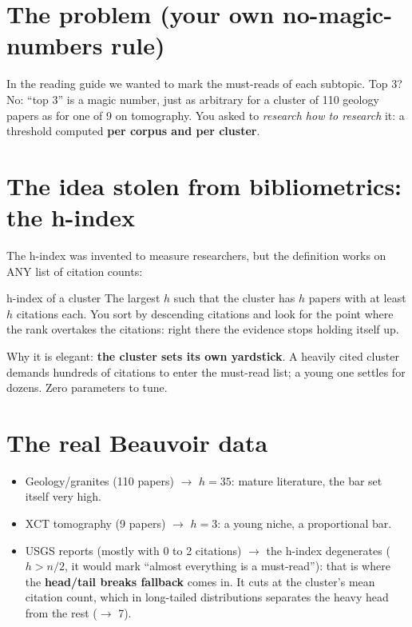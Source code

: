 \documentclass[11pt,a4paper]{article}
\begin{document}

\section{The problem (your own no-magic-numbers rule)}

In the reading guide we wanted to mark the must-reads of each subtopic. Top 3? No: ``top 3''
is a magic number, just as arbitrary for a cluster of 110 geology papers as for one of 9 on
tomography. You asked to \emph{research how to research} it: a threshold computed \textbf{per
corpus and per cluster}.

\section{The idea stolen from bibliometrics: the h-index}

The h-index was invented to measure researchers, but the definition works on ANY list of
citation counts:

\begin{concepto}{h-index of a cluster}
The largest $h$ such that the cluster has $h$ papers with at least $h$ citations each. You sort
by descending citations and look for the point where the rank overtakes the citations: right
there the evidence stops holding itself up.
\end{concepto}

Why it is elegant: \textbf{the cluster sets its own yardstick}. A heavily cited cluster demands
hundreds of citations to enter the must-read list; a young one settles for dozens. Zero
parameters to tune.

\section{The real Beauvoir data}

\begin{itemize}
  \item Geology/granites (110 papers) $\rightarrow$ $h = 35$: mature literature, the bar set
        itself very high.
  \item XCT tomography (9 papers) $\rightarrow$ $h = 3$: a young niche, a proportional bar.
  \item USGS reports (mostly with 0 to 2 citations) $\rightarrow$ the h-index degenerates
        ($h > n/2$, it would mark ``almost everything is a must-read''): that is where the
        \textbf{head/tail breaks fallback} comes in. It cuts at the cluster's mean citation
        count, which in long-tailed distributions separates the heavy head from the rest
        ($\rightarrow$ 7).
\end{itemize}
\end{document}
